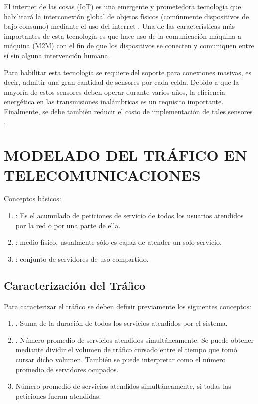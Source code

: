 El internet de las cosas (IoT) es una emergente y prometedora tecnología que habilitará la interconexión global de objetos físicos (comúnmente dispositivos de bajo consumo) mediante el uso del internet \parencite{5GSurveyAkpaku}. Una de las características más importantes de esta tecnología es que hace uso de la comunicación máquina a máquina (M2M) con el fin de que los dispositivos se conecten y comuniquen entre sí sin alguna intervención humana.\newline

Para habilitar esta tecnología se requiere del soporte para conexiones masivas, es decir, admitir una gran cantidad de sensores por cada celda. Debido a que la mayoría de estos sensores deben operar durante varios años, la eficiencia energética en las transmisiones inalámbricas es un requisito importante. Finalmente, se debe también reducir el costo de implementación de tales sensores \parencite{IoT5GWire}.


\section{MODELADO DEL TRÁFICO EN TELECOMUNICACIONES}

Conceptos básicos:
\begin{enumerate}
\item  {}: Es el acumulado de peticiones de servicio de todos los usuarios atendidos por la red o por una parte de ella.
\item  {}: medio físico, usualmente sólo es capaz de atender un solo servicio.
\item  {}: conjunto de servidores de uso compartido.
\end{enumerate}

\subsection{Caracterización del Tráfico}
Para caracterizar el tráfico se deben definir previamente los siguientes conceptos:
\begin{enumerate}
\item  {}. Suma de la duración de todos los servicios atendidos por el sistema.
\item  {}. Número promedio de servicios atendidos simultáneamente. Se puede obtener mediante dividir el volumen de tráfico cursado entre el tiempo que tomó cursar dicho volumen. También se puede interpretar como el número promedio de servidores ocupados.
\item  {} Número promedio de servicios atendidos simultáneamente, si todas las peticiones fueran atendidas.
\end{enumerate}


